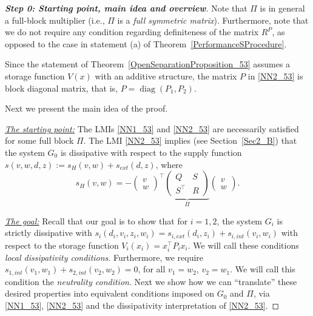 \documentclass[11pt,a4paper,oneside,DIV=12,headings=small]{scrartcl}
\newcommand{\diag}{\operatorname{diag}}
\theoremstyle{plain}
\begin{document}
\begin{proof}[\textbf{Step 0: \emph{Starting point, main idea and overview}}]
Note that $\Pi$ is in general a full-block multiplier (i.e., $\Pi$ is a \emph{full symmetric matrix}).
Furthermore, note that we do not require any condition regarding definiteness of the matrix $R^P$, as opposed to the case in statement (a) of Theorem~\ref{PerformanceSProcedure}. 

Since the statement of Theorem~\ref{OpenSeparationProposition_53} assumes a storage function $V(x)$ with an additive structure, the matrix $P$ in \eqref{NN2_53} is block diagonal matrix, that is, $P=\diag(P_1,P_2)$. 

Next we present the main idea of the proof. 

\emph{\underline{The starting point:}} The LMIs \eqref{NN1_53} and \eqref{NN2_53} are necessarily satisfied for some full block $\Pi$. The LMI \eqref{NN2_53} implies (see Section~\ref{Sec2_B}) that the system $G_0$ is dissipative with respect to the supply function $s(v,w,d,z):=s_H(v,w)+s_{ext}(d,z)$, where 
\begin{equation}
\label{sH}
s_H(v,w)=-\begin{pmatrix}v \\ w\end{pmatrix}^\top \underbrace{\begin{pmatrix}Q & S \\ S^\top & R\end{pmatrix}}_{\Pi} \begin{pmatrix}v \\ w\end{pmatrix}.  
\end{equation}

\emph{\underline{The goal:}} Recall that our goal is to show that for $i=1,2$, the system $G_i$ is strictly dissipative with $s_i(d_i,v_i,z_i,w_i)=s_{i,ext}(d_i,z_i)+s_{i,int}(v_i,w_i)$ with respect to the storage function $V_i(x_i)=x_i^\top P_i x_i$. We will call these conditions \emph{local dissipativity conditions}. Furthermore, we require $s_{1,int}(v_1,w_1)+s_{2,int}(v_2,w_2)=0$, for all $v_1=w_2$, $v_2=w_1$. We will call this condition the \emph{neutrality condition}.
Next we show how we can ``translate'' these desired properties into equivalent conditions imposed on $G_0$ and $\Pi$, via \eqref{NN1_53}, \eqref{NN2_53} and the dissipativity interpretation of \eqref{NN2_53}.


\end{proof}
\end{document}
